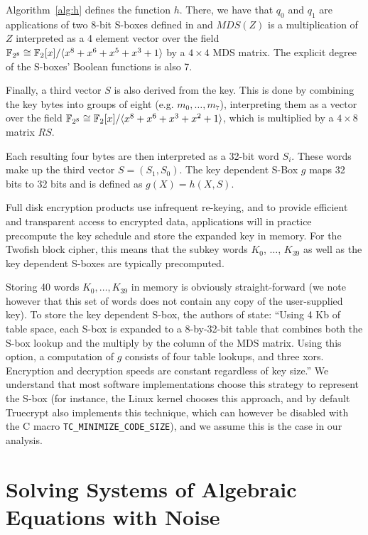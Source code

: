 Algorithm~\ref{alg:h} defines the function $h$. There, we have that $q_0$ and $q_1$ are applications of two 8-bit S-boxes defined in \cite{twofish} and $MDS(Z)$ is a multiplication of $Z$ interpreted as a 4 element vector over the field $\mathbb{F}_{2^8}
\cong \mathbb{F}_2[x]/\langle x^8 + x^6 + x^5 + x^3 + 1 \rangle$ by a $4 \times 4$ MDS matrix. The explicit degree of the S-boxes' Boolean functions is also 7.

Finally, a third vector $S$ is also derived from the key. This is done by combining the key bytes into groups of eight (e.g. $m_0,\dots,m_7$), interpreting them as a vector over the field $\mathbb{F}_{2^8} \cong \mathbb{F}_2[x]/\langle x^8 + x^6 + x^3 + x^2 + 1\rangle$, which is multiplied by a $4 \times 8$ matrix $RS$.

Each resulting four bytes are then interpreted as a 32-bit word $S_i$. These words make up the third vector $S = (S_1,S_0)$. The key dependent S-Box $g$ maps
32 bits to 32 bits and is defined as $g(X) = h(X,S)$.

Full disk encryption products use infrequent re-keying, and to provide efficient and transparent access to encrypted data, applications will in practice precompute the key schedule and store the expanded key in memory. For the Twofish block cipher, this means that the subkey words $K_0$, $\dots$, $K_{39}$ as well as the key dependent S-boxes are typically precomputed. 

Storing 40 words $K_0,\dots,K_{39}$ in memory is obviously straight-forward (we note however that this set of words does not contain any copy of the user-supplied key).
To store the key dependent S-box, the authors of \cite{twofish} state: ``Using 4 Kb of table space, each S-box is expanded to a 8-by-32-bit table that combines both the S-box lookup and the multiply by the column of the MDS matrix. Using this option, a computation of $g$ consists of four table lookups, and three xors. Encryption and decryption speeds are constant regardless of key size.'' We understand that most software implementations choose this strategy to represent the S-box (for instance, the Linux kernel chooses this approach, and by default Truecrypt also implements this technique, which can however be disabled with the C macro \verb|TC_MINIMIZE_CODE_SIZE|), and we assume this is the case in our analysis.


\section{Solving Systems of Algebraic Equations with Noise}
\label{sec:algebra}

